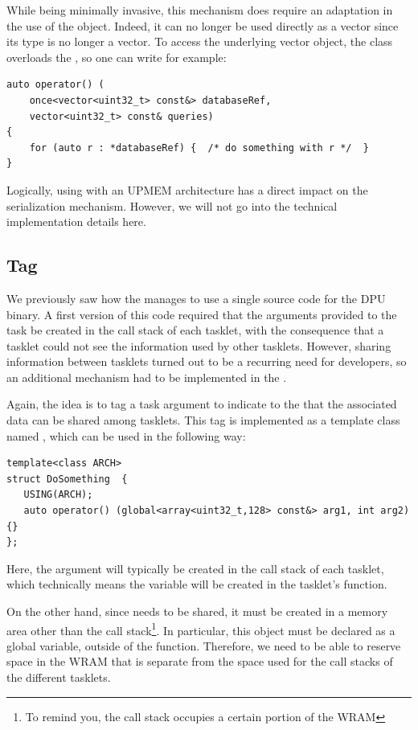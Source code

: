 While being minimally invasive, this mechanism does require an adaptation in the use of the  object. 
Indeed, it can no longer be used directly as a vector since its type is no longer a vector. 
To access the underlying vector object, the  class overloads the , so one can write for example: 
\begin{verbatim}
auto operator() (
    once<vector<uint32_t> const&> databaseRef, 
    vector<uint32_t> const& queries)  
{
    for (auto r : *databaseRef) {  /* do something with r */  }
}
\end{verbatim}

Logically, using  with an UPMEM architecture has a direct impact on the serialization mechanism. 
However, we will not go into the technical implementation details here.

\subsection{Tag }

We previously saw how the \BPL manages to use a single source code for the DPU binary. 
A first version of this code required that the arguments provided to the task be created in the call stack of each tasklet, 
with the consequence that a tasklet could not see the information used by other tasklets.
However, sharing information between tasklets turned out to be a recurring need for developers, so an additional mechanism 
had to be implemented in the \BPL.

Again, the idea is to tag a task argument to indicate to the \BPL that the associated data can be shared among tasklets. 
This tag is implemented as a template class named , which can be used in the following way:
 \begin{verbatim}
template<class ARCH>
struct DoSomething  {
   USING(ARCH);
   auto operator() (global<array<uint32_t,128> const&> arg1, int arg2) {}
};
\end{verbatim}

Here, the argument  will typically be created in the call stack of each tasklet, which technically means
 the variable will be created in the tasklet's  function.

On the other hand, since  needs to be shared, it must be created in a memory area other than the 
call stack\footnote{To remind you, the call stack occupies a certain portion of the WRAM}.
In particular, this object must be declared as a global variable, outside of the  function.
Therefore, we need to be able to reserve space in the WRAM that is separate from the space used for the
 call stacks of the different tasklets.

